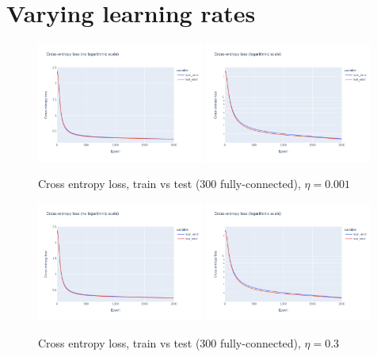 \documentclass[12pt]{article}
\begin{document}
\newpage
\appendix
\section{Varying learning rates}
\begin{figure}[ht]
  \centering
  \includegraphics[width=0.49\textwidth]{images/cross-entropy-comparison-1-300-lr0.001.png}
  \includegraphics[width=0.49\textwidth]{images/cross-entropy-comparison-1-300-lr0.001-log.png}
  \caption{Cross entropy loss, train vs test ($300$ fully-connected), $\eta = 0.001$}
  \label{fig: learning rate comparison 0.001}
\end{figure}
\begin{figure}[ht]
  \centering
  \includegraphics[width=0.49\textwidth]{images/cross-entropy-comparison-1-300-lr0.3.png}
  \includegraphics[width=0.49\textwidth]{images/cross-entropy-comparison-1-300-lr0.3-log.png}
  \caption{Cross entropy loss, train vs test ($300$ fully-connected), $\eta = 0.3$}
  \label{fig: learning rate comparison 0.3}
\end{figure}
\end{document}
